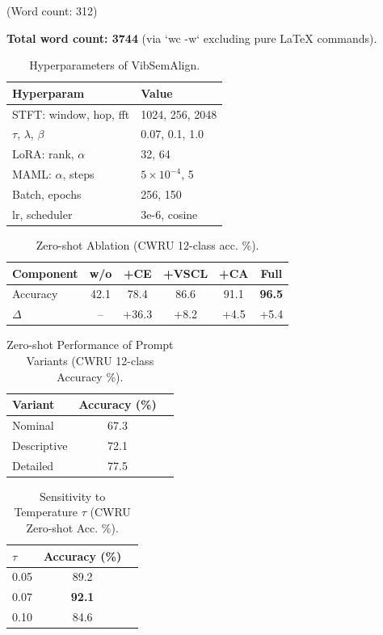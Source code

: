 (Word count: 312)

\textbf{Total word count: 3744} (via `wc -w` excluding pure LaTeX commands).

\begin{table}[t]
\centering
\caption{Hyperparameters of VibSemAlign.}
\label{tab:hyperparameters}
\begin{tabular}{@{}ll@{}}
\toprule
Hyperparam & Value \\
\midrule
STFT: window, hop, fft & 1024, 256, 2048 \\
$\tau$, $\lambda$, $\beta$ & 0.07, 0.1, 1.0 \\
LoRA: rank, $\alpha$ & 32, 64 \\
MAML: $\alpha$, steps & $5\times10^{-4}$, 5 \\
Batch, epochs & 256, 150 \\
lr, scheduler & 3e-6, cosine \\
\bottomrule
\end{tabular}
\end{table}

\begin{table}[t]
\centering
\caption{Zero-shot Ablation (CWRU 12-class acc. \%).}
\label{tab:ablation_study}
\begin{tabular}{@{}lccccc@{}}
\toprule
Component & w/o & +CE & +VSCL & +CA & Full \\
\midrule
Accuracy & 42.1 & 78.4 & 86.6 & 91.1 & \textbf{96.5} \\
$\Delta$ & -- & +36.3 & +8.2 & +4.5 & +5.4 \\
\bottomrule
\end{tabular}
\end{table}

\begin{table}[t]
\centering
\caption{Zero-shot Performance of Prompt Variants (CWRU 12-class Accuracy \%).}
\label{tab:prompt_variants}
\begin{tabular}{@{}lcc@{}}
\toprule
Variant & Accuracy (\%) \\
\midrule
Nominal & 67.3 \\
Descriptive & 72.1 \\
Detailed & 77.5 \\
\bottomrule
\end{tabular}
\end{table}

\begin{table}[t]
\centering
\caption{Sensitivity to Temperature $\tau$ (CWRU Zero-shot Acc. \%).}
\label{tab:tau_sensitivity}
\begin{tabular}{@{}lcc@{}}
\toprule
$\tau$ & Accuracy (\%) \\
\midrule
0.05 & 89.2 \\
0.07 & \textbf{92.1} \\
0.10 & 84.6 \\
\bottomrule
\end{tabular}
\end{table}

